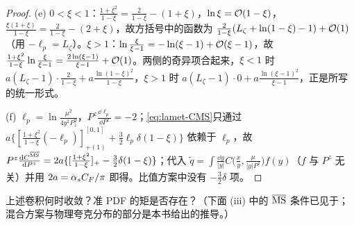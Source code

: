 \begin{proof}
(e) $0<\xi<1$：$\frac{1+\xi^2}{1-\xi}=\frac2{1-\xi}-(1+\xi)$，$\ln\xi=\mathcal{O}\!\left(1-\xi\right)$，$\frac{\xi(1+\xi)}{1-\xi}=\frac2{1-\xi}-(2+\xi)$，故方括号中的函数为 $\frac2{1-\xi}(L_\zeta+\ln(1-\xi)-1)+\mathcal{O}\!\left(1\right)$（用 $-\ell_p=L_\zeta$）。$\xi>1$：$\ln\frac\xi{\xi-1}=-\ln(\xi-1)+\mathcal{O}\!\left(\xi-1\right)$，故 $\frac{1+\xi^2}{1-\xi}\ln\frac\xi{\xi-1}=\frac{2\ln(\xi-1)}{\xi-1}+\mathcal{O}\!\left(1\right)$。两侧的奇异项合起来，$\xi<1$ 时 $a(L_\zeta-1)\cdot\frac2{1-\xi}+a\frac{\ln(1-\xi)^2}{1-\xi}$，$\xi>1$ 时 $a(L_\zeta-1)\cdot0+a\frac{\ln(\xi-1)^2}{\xi-1}$，正是所写的统一形式。

(f) $\ell_p=\ln\frac{\mu^2}{4y^2P_z^2}$，$P^z\frac{\dd\ell_p}{\dd P^z}=-2$；\cref{eq:lamet-CMS}只通过 $a\{[\frac{1+\xi^2}{1-\xi}(-\ell_p)]^{[0,1]}_{+(1)}+\frac32\ell_p\delta(1-\xi)\}$ 依赖于 $\ell_p$，故 $P^z\frac{\mathrm{d} C^{\overline{\mathrm{MS}}}}{\mathrm{d} P^z}=2a\{[\frac{1+\xi^2}{1-\xi}]_+-\frac32\delta(1-\xi)\}$；代入 $\tilde q=\int\frac{\dd y}{|y|}C\big(\frac xy,\frac\mu{|y|P^z}\big)f(y)$（$f$ 与 $P^z$ 无关）并用 $2a=\alpha_s C_F/\pi$ 即得。比值方案中没有 $-\frac32\delta$ 项。
\end{proof}

上述卷积何时收敛？准 PDF 的矩是否存在？（下面 (iii) 中的 $\overline{\mathrm{MS}}$ 条件已见于\cite{IzubuchiEtAl2018}；混合方案与物理夸克分布的部分是本书给出的推导。）


